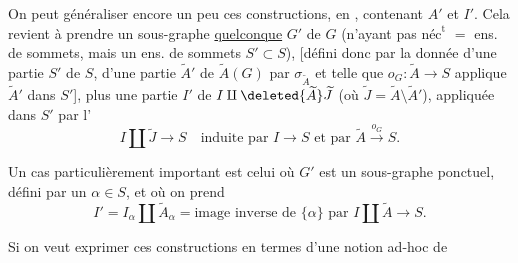 On peut généraliser encore un peu ces constructions, en    , contenant $A'$ et $I'$. Cela revient à prendre un sous-graphe \uline{quelconque} $G'$ de $G$ (n'ayant pas $\text{néc}^{\text{t}}$  $=$ ens. de sommets, mais un ens. de sommets $S'\subset S$), [défini donc par la donnée d'une partie $S'$ de $S$, d'une partie $\widetilde A'$ de $\widetilde A(G)$  par $\sigma_{\widetilde A}$ et telle que $o_G:\widetilde A\longrightarrow S$ applique $\widetilde A'$ dans $S'$], plus une partie $I'$ de $I\amalg\deleted{\widetilde A}\widetilde J$ (où $\widetilde J=\widetilde A\setminus\widetilde A'$), appliquée dans $S'$ par l'
\[
I\amalg\widetilde J\longrightarrow S\quad\text{induite par }I\longrightarrow S\text{ et par }\widetilde A\xrightarrow{o_G}S.
\]

Un cas particulièrement important est celui où $G'$ est un sous-graphe ponctuel, défini par un $\alpha\in S$,  et où on prend
\[
I'=I_\alpha\amalg\widetilde A_\alpha=\text{image inverse de }\{\alpha\}\text{ par }I\amalg\widetilde A\longrightarrow S.
\]

Si on veut exprimer ces constructions en termes d'une notion ad-hoc de
